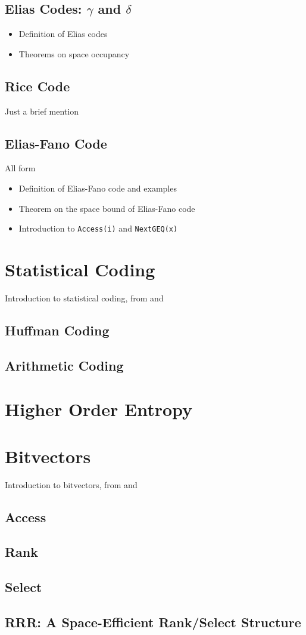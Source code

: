 \subsection{Elias Codes: $\gamma$ and $\delta$}
\begin{itemize}
    \item Definition of Elias codes
    \item Theorems on space occupancy
\end{itemize}

\subsection{Rice Code}
Just a brief mention
\subsection{Elias-Fano Code}
All form \cite{ferragina2023pearls,sayood2002lossless}
\begin{itemize}
    \item Definition of Elias-Fano code and examples
    \item Theorem on the space bound of Elias-Fano code
    \item Introduction to \texttt{Access(i)} and \texttt{NextGEQ(x)}
\end{itemize}

\section{Statistical Coding}

Introduction to statistical coding, from \cite{han2002mathematics} and \cite{ferragina2023pearls}

\subsection{Huffman Coding}

\subsection{Arithmetic Coding}

\section{Higher Order Entropy}

\section{Bitvectors}

Introduction to bitvectors, from \cite{ferragina2023pearls} and \cite{navarro2016compact}

\subsection{Access}
\subsection{Rank}
\subsection{Select}
\subsection{RRR: A Space-Efficient Rank/Select Structure}
